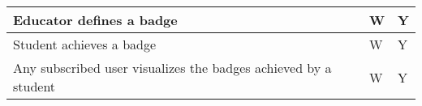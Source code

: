 \begin{center}
\begin{longtable}{|p{8.7cm}|p{3cm}|p{3cm}|}
        Educator defines a badge                                                                                                              & W                      & Y               \\ \hline
        Student achieves a badge                                                                                                              & W                      & Y               \\ \hline
        Any subscribed user visualizes the badges achieved by a student                                                                       & W                      & Y               \\ \hline
    \end{longtable}
\end{center}